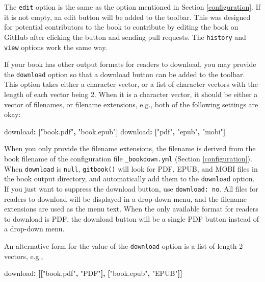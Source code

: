 \documentclass[
  12pt,
]{krantz}
\newenvironment{Shaded}{\begin{snugshade}}{\end{snugshade}}
\newcommand{\AttributeTok}[1]{\textcolor[rgb]{0.77,0.63,0.00}{#1}}
\newcommand{\FunctionTok}[1]{\textcolor[rgb]{0.00,0.00,0.00}{#1}}
\newcommand{\KeywordTok}[1]{\textcolor[rgb]{0.13,0.29,0.53}{\textbf{#1}}}
\newcommand{\StringTok}[1]{\textcolor[rgb]{0.31,0.60,0.02}{#1}}
\theoremstyle{definition}
\theoremstyle{definition}
\theoremstyle{definition}
\theoremstyle{definition}
\theoremstyle{remark}
\begin{document}
The \texttt{edit} option is the same as the option mentioned in Section \ref{configuration}. If it is not empty, an edit button will be added to the toolbar. This was designed for potential contributors to the book to contribute by editing the book on GitHub after clicking the button and sending pull requests. The \texttt{history} and \texttt{view} options work the same
way.

If your book has other output formats for readers to download, you may provide the \texttt{download} option so that a download button can be added to the toolbar. This option takes either a character vector, or a list of character vectors with the length of each vector being 2. When it is a character vector, it should be either a vector of filenames, or filename extensions, e.g., both of the following settings are okay:

\begin{Shaded}
\begin{Highlighting}[]
\AttributeTok{    }\FunctionTok{download}\KeywordTok{:}\AttributeTok{ }\KeywordTok{[}\StringTok{"book.pdf"}\KeywordTok{,}\AttributeTok{ }\StringTok{"book.epub"}\KeywordTok{]}
\AttributeTok{    }\FunctionTok{download}\KeywordTok{:}\AttributeTok{ }\KeywordTok{[}\StringTok{"pdf"}\KeywordTok{,}\AttributeTok{ }\StringTok{"epub"}\KeywordTok{,}\AttributeTok{ }\StringTok{"mobi"}\KeywordTok{]}
\end{Highlighting}
\end{Shaded}

When you only provide the filename extensions, the filename is derived from the book filename of the configuration file \texttt{\_bookdown.yml} (Section \ref{configuration}). When \texttt{download} is \texttt{null}, \texttt{gitbook()} will look for PDF, EPUB, and MOBI files in the book output directory, and automatically add them to the \texttt{download} option. If you just want to suppress the download button, use \texttt{download:\ no}. All files for readers to download will be displayed in a drop-down menu, and the filename extensions are used as the menu text. When the only available format for readers to download is PDF, the download button will be a single PDF button instead of a drop-down menu.

An alternative form for the value of the \texttt{download} option is a list of length-2 vectors, e.g.,

\begin{Shaded}
\begin{Highlighting}[]
\AttributeTok{    }\FunctionTok{download}\KeywordTok{:}\AttributeTok{ }\KeywordTok{[[}\StringTok{"book.pdf"}\KeywordTok{,}\AttributeTok{ }\StringTok{"PDF"}\KeywordTok{],}\AttributeTok{ }\KeywordTok{[}\StringTok{"book.epub"}\KeywordTok{,}\AttributeTok{ }\StringTok{"EPUB"}\KeywordTok{]]}
\end{Highlighting}
\end{Shaded}
\end{document}

